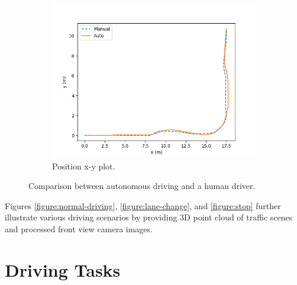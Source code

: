 \begin{figure}[h]
\begin{subfigure}[b]{0.45\linewidth}
    \includegraphics[width=\linewidth]{figures/experiments/position-plot.png}
    \caption{Position x-y plot.}
  \end{subfigure}
  \caption[Comparison between autonomous driving and a human driver]{Comparison
    between autonomous driving and a human driver.}
  \label{figure:driving-comparison}
\end{figure}


Figures \ref{figure:normal-driving}, \ref{figure:lane-change}, and
\ref{figure:stop} further illustrate various driving scenarios by providing 3D
point cloud of traffic scenes and processed front view camera images.

\section{Driving Tasks}

